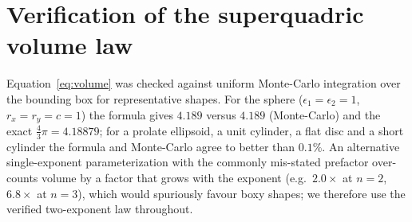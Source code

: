 \documentclass[aps,pre,twocolumn,superscriptaddress,floatfix,nofootinbib]{revtex4-2}
\begin{document}
\appendix
\section{Verification of the superquadric volume law}
\label{app:volume}
Equation~\eqref{eq:volume} was checked against uniform Monte-Carlo integration
over the bounding box for representative shapes. For the sphere
($\epsilon_1=\epsilon_2=1$, $r_x=r_y=c=1$) the formula gives $4.189$ versus
$4.189$ (Monte-Carlo) and the exact $\tfrac{4}{3}\pi=4.18879$; for a prolate
ellipsoid, a unit cylinder, a flat disc and a short cylinder the formula and
Monte-Carlo agree to better than $0.1\%$. An alternative single-exponent
parameterization with the commonly mis-stated prefactor over-counts volume by a
factor that grows with the exponent (e.g.\ $2.0\times$ at $n=2$, $6.8\times$ at
$n=3$), which would spuriously favour boxy shapes; we therefore use the
verified two-exponent law throughout.



\end{document}
